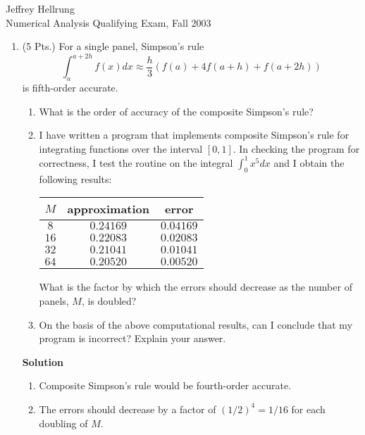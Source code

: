 \documentclass{article}
\begin{document}
\begin{flushright}
Jeffrey Hellrung \\
Numerical Analysis Qualifying Exam, Fall 2003 \\
\end{flushright}


\begin{enumerate}

\item (5 Pts.) For a single panel, Simpson's rule
\[\int_a^{a + 2h} f(x) dx \approx \frac{h}{3} \left( f(a) + 4 f(a + h) + f(a + 2h) \right)\]
is fifth-order accurate.

\begin{enumerate}
\item What is the order of accuracy of the composite Simpson's rule?

\item I have written a program that implements composite Simpson's rule for integrating functions over the interval \([0,1]\).  In checking the program for correctness, I test the routine on the integral \(\int_0^1 x^5 dx\) and I obtain the following results:
\begin{center}
\begin{tabular}{|c|c|c|}
\(M\) & approximation & error \\
\hline
\(8\) & \(0.24169\) & \(0.04169\) \\
\(16\) & \(0.22083\) & \(0.02083\) \\
\(32\) & \(0.21041\) & \(0.01041\) \\
\(64\) & \(0.20520\) & \(0.00520\) \\
\end{tabular}
\end{center}
What is the factor by which the errors should decrease as the number of panels, \(M\), is doubled?

\item On the basis of the above computational results, can I conclude that my program is incorrect?  Explain your answer.

\end{enumerate}

{\bf Solution}

\begin{enumerate}
\item Composite Simpson's rule would be fourth-order accurate.

\item The errors should decrease by a factor of \((1/2)^4 = 1/16\) for each doubling of \(M\).


\end{enumerate}
\end{enumerate}
\end{document}
